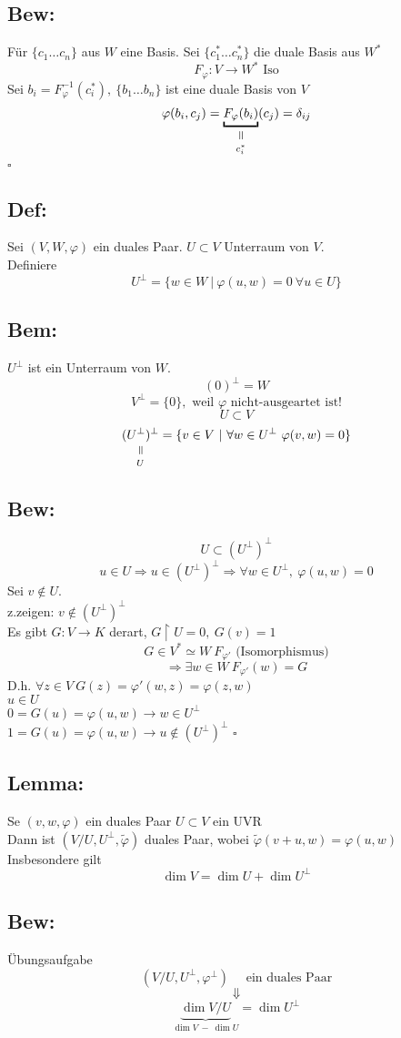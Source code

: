 \documentclass[titlepage,12pt,a4paper,ngerman]{report}
\newenvironment{bew}{\subsection{Bew:}}{\hfill$\square$}
\newcommand{\Bew}[1]{\begin{bew}#1\end{bew}}
\newcommand{\verteq}{\rotatebox{90}{$\,=$}}
\newcommand{\equalto}[2]{\underset{\scriptstyle\overset{\mkern4mu\verteq}{#2}}{#1}}
\newcommand{\tx}[1]{\textrm{#1}}
\newcommand{\ub}[1]{\underbrace{#1}}
\begin{document}
\Bew{
	Für $\{c_1 \dots c_n\}$ aus $W$ eine Basis.
	Sei $\{c_1^* \dots c_n^*\}$ die duale Basis aus $W^*$
	$$F_\varphi: V \to W^* \tx{ Iso}$$
	Sei $b_i = F_\varphi^{-1}(c_i^*),\ \{b_1 \dots b_n\}$ ist eine duale Basis von $V$
	$$\varphi(b_i, c_j) = \equalto{\underbracket{F_\varphi(b_i)}}{c_i^*}(c_j) = \delta_{ij}$$
}

\subsection{Def:}
Sei $(V,W,\varphi)$ ein duales Paar. $U \subset V$ Unterraum von $V$.\\
Definiere $$U^\perp = \{w \in W \ |\  \varphi (u,w) = 0\ \forall u \in U \}$$
\subsection*{Bem:}
$U^\perp$ ist ein Unterraum von $W$.
$$(0)^\perp = W$$
$$V^\perp = \{0\}, \tx{ weil $\varphi$ nicht-ausgeartet ist!}$$
$$U \subset V$$
$$\equalto{(U^\perp)^\perp}{U} = \{v \in V \ | \  \forall w \in U^\perp\ \varphi(v,w) = 0 \}$$
\Bew{
	$$U\subset (U^\perp)^\perp$$
	$$u \in U \Rightarrow  u \in (U^\perp)^\perp \Rightarrow \forall w \in U^\perp,\ \varphi(u,w) = 0$$
	Sei $v \notin U.$\\
	z.zeigen: $v \notin (U^\perp)^\perp$\\
	Es gibt $G: V \to K$ derart, $G\upharpoonright U = 0,\ G(v) = 1$
	$$G \in V^* \simeq W\ F_{\varphi'} \tx{ (Isomorphismus)}$$
	$$\Rightarrow \exists w \in W\ F_{\varphi'}(w) = G$$
	D.h. $\forall z \in V\ G (z) = \varphi' (w,z) = \varphi(z,w)$\\
	$u \in U$\\
	$ 0 = G(u) = \varphi(u,w) \rightarrow w \in U^\perp $\\
	$ 1 = G(u) = \varphi(u,w) \rightarrow u \notin (U^\perp)^\perp $
}
\subsection{Lemma:}
Se $ (v,w,\varphi) $ ein duales Paar $ U\subset V $ ein UVR\\
Dann ist $ (V/U, U^\perp, \tilde{\varphi}) $ duales Paar, wobei $ \tilde{\varphi}(v+u,w) = \varphi(u,w) $\\
Insbesondere gilt $$ \dim V = \dim U + \dim U^\perp $$
\subsection*{Bew:}
Übungsaufgabe
$$ (V/U,U^\perp,\varphi^\perp) \quad \tx{ ein duales Paar}$$
$$ \Downarrow$$
$$ \ub{\dim V/U}_{\dim V \  -\  \dim U} = \dim U^\perp $$
\end{document}
